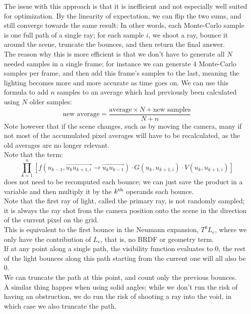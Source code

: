 \documentclass[12pt]{article}
\begin{document}
The issue with this approach is that it is inefficient
and not especially well suited for optimization.
By the linearity of expectation, we can flip
the two sums, and still converge towards the same 
result:
In other words, each Monte-Carlo sample is one full
path of a single ray; for each sample $i$,
we shoot a ray, bounce it around the scene,
truncate the bounces, and then return the final answer. \\

The reason why this is more efficient is that we 
don't have to generate all $N$ needed samples in a 
single frame; for instance we can generate $4$
Monte-Carlo samples per frame, and then add
this frame's samples to the last, meaning the lighting
becomes more and more accurate as time goes on.
We can use this formula to add $n$ samples to an average
which had previously been calculated using $N$
older samples:
\[ \text{new average} = 
\dfrac{\text{average} \times N + 
\text{new samples}}{N + n} \]
Note however that if the scene changes, such as by moving
the camera, many if not most of the accumulated
pixel averages will have to be recalculated,
as the old averages are no longer relevant. \\

Note that the term:
\[ \prod_{k=1}^{n} 
\left[ f(u_{k-1}, \overset{\rightarrow}{u_k u_{k+1, i}} 
    \to \overset{\rightarrow}{u_k u_{k-1}})  \cdot 
G(u_k, u_{k+1, i}) \cdot V(u_k, u_{k+1, i}) \right] \]
does not need to be recomputed each bounce;
we can just save the product in a variable
and then multiply it by the $k^{\text{th}}$
operands each bounce. \\

Note that the first ray of light, called the primary
ray, is not randomly sampled; it is always
the ray shot from the camera position onto the scene
in the direction of the current pixel on the grid. \\
This is equivalent to the first bounce in the Neumann
expansion, $T^0L_e$, where we only have the contribution
of $L_e$, that is, no BRDF or geometry term. \\

If at any point along a single path, the visibility
function evaluates to $0$, the rest of the light
bounces along this path starting from the current one
will all also be $0$. \\
We can truncate the path at this point, and count only
the previous bounces. \\
A similar thing happes when using solid angles;
while we don't run the risk of having an obstruction,
we do run the risk of shooting a ray into the void,
in which case we also truncate the path. \\
\end{document}
